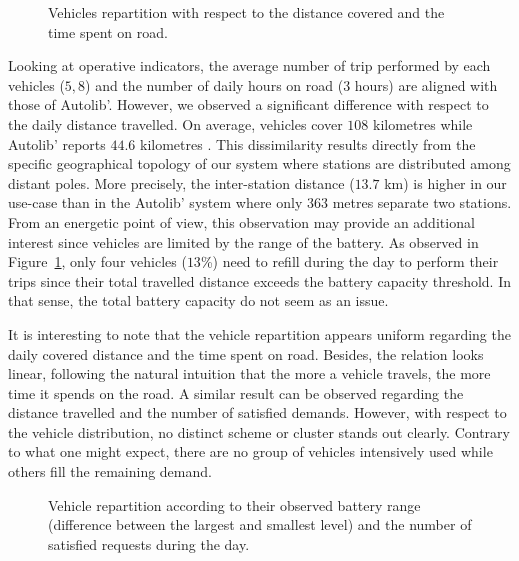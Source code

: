 \begin{figure}[t]
\centering

\caption{Vehicles repartition with respect to the distance covered and the time spent on road.}
\label{fig:VehicleDistVsNbTSTraveling}
\end{figure}
\medskip
Looking at operative indicators, the average number of trip performed by each vehicles ($5,8$) and the number of daily hours on road ($3$ hours) are aligned with those of Autolib'.
However, we observed a significant difference with respect to the daily distance travelled.
On average, vehicles cover $108$ kilometres while Autolib' reports $44.6$ kilometres \cite{autolib_rapport_2014}.
This dissimilarity results directly from the specific geographical topology of our system where stations are distributed among distant poles.
More precisely, the inter-station distance ($13.7$ km) is higher in our use-case than in the Autolib' system where only $363$ metres separate two stations.
From an energetic point of view, this observation may provide an additional interest since vehicles are limited by the range of the battery.
As observed in Figure~\ref{fig:VehicleDistVsNbTSTraveling}, only four vehicles ($13$\%) need to refill during the day to perform their trips since their total travelled distance exceeds the battery capacity threshold.
In that sense, the total battery capacity do not seem as an issue.

It is interesting to note that the vehicle repartition appears uniform regarding the daily covered distance and the time spent on road.
Besides, the relation looks linear, following the natural intuition that the more a vehicle travels, the more time it spends on the road.
A similar result can be observed regarding the distance travelled and the number of satisfied demands.
However, with respect to the vehicle distribution, no distinct scheme or cluster stands out clearly.
Contrary to what one might expect, there are no group of vehicles intensively used while others fill the remaining demand.


\begin{figure}[t]
\centering

\caption{Vehicle repartition according to their observed battery range (difference between the largest and smallest level) and the number of satisfied requests during the day.}
\label{fig:MaxEnergyUsedVsNbTSTraveling}
\end{figure}

